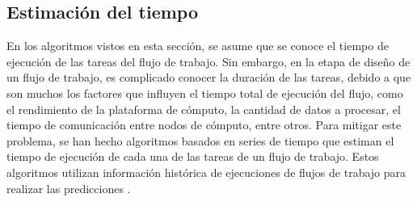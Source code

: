 \subsection{Estimación del tiempo}
En los algoritmos vistos en esta sección, se asume que se conoce el tiempo de ejecución de las tareas del flujo de trabajo. Sin embargo, en la etapa de diseño de un flujo de trabajo, es complicado conocer la duración de las tareas, debido a que son muchos los factores que influyen el tiempo total de ejecución del flujo, como el rendimiento de la plataforma de cómputo, la cantidad de datos a procesar, el tiempo de comunicación entre nodos de cómputo, entre otros. Para mitigar este problema, se han hecho algoritmos basados en series de tiempo que estiman el tiempo de ejecución de cada una de las tareas de un flujo de trabajo. Estos algoritmos utilizan información histórica de ejecuciones de flujos de trabajo para realizar las predicciones  \cite{liu2011novel}.
